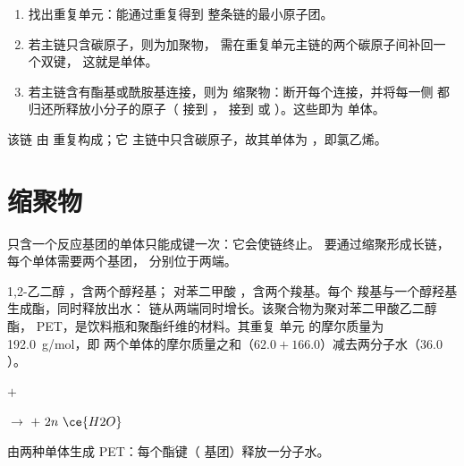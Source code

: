 \begin{method}[由聚合物求单体]\label{met:g12:polymers:monomer}
\begin{enumerate}
  \item 找出重复单元：能通过重复得到
        整条链的最小原子团。
  \item 若主链只含碳原子，则为加聚物，
        需在重复单元主链的两个碳原子间补回一个双键，
        这就是单体。
  \item 若主链含有酯基或酰胺基连接，则为
        缩聚物：断开每个连接，并将每一侧
        都归还所释放小分子的原子（ 接到
        ， 接到  或 ）。这些即为
        单体。
\end{enumerate}
\end{method}

\begin{example}\label{ex:g12:polymers:pvc}
该链  由  重复构成；它
主链中只含碳原子，故其单体为
，即氯乙烯。
\end{example}

\section{缩聚物}

只含一个反应基团的单体只能成键一次：它会使链终止。
要通过缩聚形成长链，每个单体需要两个基团，
分别位于两端。

\begin{example}\label{ex:g12:polymers:pet}
1,2-乙二醇 ，含两个醇羟基；
对苯二甲酸 ，含两个羧基。每个
羧基与一个醇羟基生成酯，同时释放出水：
链从两端同时增长。该聚合物为聚对苯二甲酸乙二醇酯，
PET，是饮料瓶和聚酯纤维的材料。其重复
单元  的摩尔质量为 \qty{192.0}{g/mol}，即
两个单体的摩尔质量之和（$62.0 + 166.0$）减去两分子水（$36.0$）。
\end{example}

\begin{omfigure}
\quad $+$ \quad
{}

\medskip
$\longrightarrow$\quad
{}
\quad $+\ 2n\ \ce{H2O}$

{\small 由两种单体生成 PET：每个酯键（
基团）释放一分子水。}
\end{omfigure}

